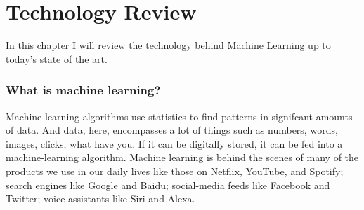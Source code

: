 \chapter{Technology Review}
In this chapter I will review the technology behind Machine Learning up to today's state of the art.

\subsection{What is machine learning?}
Machine-learning algorithms use statistics to find patterns in signifcant amounts of data. And data, here, encompasses a lot of things such as numbers, words, images, clicks, what have you. If it can be digitally stored, it can be fed into a machine-learning algorithm. Machine learning is behind the scenes of many of the products we use in our daily lives like those on Netflix, YouTube, and Spotify; search engines like Google and Baidu; social-media feeds like Facebook and Twitter; voice assistants like Siri and Alexa. 